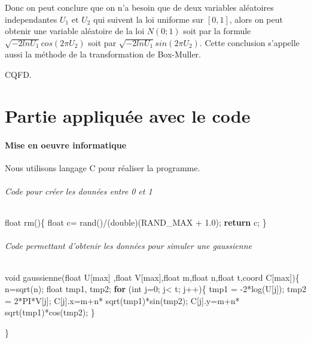 \documentclass[]{article}
\newenvironment{Shaded}{}{}
\newcommand{\ControlFlowTok}[1]{\textcolor[rgb]{0.00,0.44,0.13}{\textbf{#1}}}
\newcommand{\DataTypeTok}[1]{\textcolor[rgb]{0.56,0.13,0.00}{#1}}
\newcommand{\DecValTok}[1]{\textcolor[rgb]{0.25,0.63,0.44}{#1}}
\newcommand{\FloatTok}[1]{\textcolor[rgb]{0.25,0.63,0.44}{#1}}
\newcommand{\NormalTok}[1]{#1}
\let\oldparagraph\paragraph
\renewcommand{\paragraph}[1]{\oldparagraph{#1}\mbox{}}
\begin{document}
Donc on peut conclure que on n'a besoin que de deux variables aléatoires
independantes $U_{1}$ et $U_{2}$ qui suivent la loi uniforme sur
$[0,1]$, alors on peut obtenir une variable aléatoire de la loi $N(0;1)$
soit par la formule $\sqrt{-2lnU_{1}}cos(2\pi U_{2})$ soit par $\sqrt{-2lnU_{1}}sin(2\pi U_{2})$.
Cette conclusion s'appelle aussi la méthode de la transformation de
Box-Muller.

CQFD.

\part*{Partie appliquée avec le code}

\hypertarget{header-n501}{%
\subsection{Mise en oeuvre informatique }\label{header-n501}}

Nous utilisons langage C pour réaliser la programme.

\hypertarget{header-n504}{%
\paragraph{Code pour créer les données entre 0 et 1}\label{header-n504}}

\begin{Shaded}
\begin{Highlighting}[]
\DataTypeTok{float}\NormalTok{ rm()\{}
     \DataTypeTok{float}\NormalTok{ c= rand()/(}\DataTypeTok{double}\NormalTok{)(RAND_MAX + }\FloatTok{1.0}\NormalTok{);}
     \ControlFlowTok{return}\NormalTok{ c;}
\NormalTok{\}}
\end{Highlighting}
\end{Shaded}

\hypertarget{header-n506}{%
\paragraph{Code permettant d'obtenir les données pour simuler une
gaussienne }\label{header-n506}}

\begin{Shaded}
\begin{Highlighting}[]
\DataTypeTok{void}\NormalTok{ gaussienne(}\DataTypeTok{float}\NormalTok{ U[max] ,}\DataTypeTok{float}\NormalTok{ V[max],}\DataTypeTok{float}\NormalTok{ m,}\DataTypeTok{float}\NormalTok{ n,}\DataTypeTok{float}\NormalTok{ t,coord C[max])\{}
\NormalTok{       n=sqrt(n);}
       \DataTypeTok{float}\NormalTok{ tmp1, tmp2;}
       \ControlFlowTok{for}\NormalTok{ (}\DataTypeTok{int}\NormalTok{ j=}\DecValTok{0}\NormalTok{; j< t; j++)\{}
\NormalTok{                tmp1 = -}\DecValTok{2}\NormalTok{*log(U[j]);}
\NormalTok{                tmp2 = }\DecValTok{2}\NormalTok{*PI*V[j];}
\NormalTok{                C[j].x=m+n* sqrt(tmp1)*sin(tmp2);}
\NormalTok{                C[j].y=m+n* sqrt(tmp1)*cos(tmp2);     \}}

\NormalTok{\}}
\end{Highlighting}
\end{Shaded}
\end{document}
